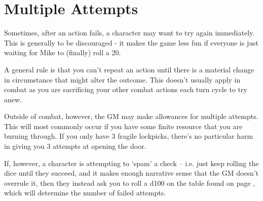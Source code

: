 \section{Multiple Attempts}

Sometimes, after an action fails, a character may want to try again immediately. This is generally to be discouraged - it makes the game less fun if everyone is just waiting for Mike to (finally) roll a 20. 

A general rule is that you can't repeat an action until there is a material change in circumstance that might alter the outcome. This doesn't usually apply in combat as you are sacrificing your other combat actions each turn cycle to try anew. 

Outside of combat, however, the GM may make allowances for multiple attempts. This will most commonly occur if you have some finite resource that you are burning through. If you only have 3 fragile lockpicks, there's no particular harm in giving you 3 attempts at opening the door. 

If, however, a character is attempting to `spam' a check -- i.e. just keep rolling the dice until they succeed, and it makes enough narrative sense that the GM doesn't overrule it, then they instead ask you to roll a d100 on the table found on page \pageref{S:Multi}, which will determine the number of failed attempts. 


